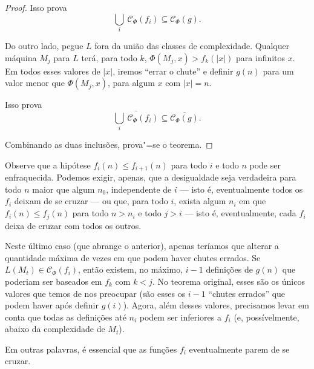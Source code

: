 \begin{proof}
    Isso prova
    \begin{equation*}
        \bigcup_i \ \mathcal C_\Phi(f_i) \subseteq \mathcal C_\Phi(g).
    \end{equation*}

    Do outro lado,
    pegue $L$ fora da união das classes de complexidade.
    Qualquer máquina $M_j$ para $L$
    terá, para todo $k$,
    $\Phi(M_j, x) > f_k(|x|)$ para infinitos $x$.
    Em todos esses valores de $|x|$,
    iremos ``errar o chute''
    e definir $g(n)$
    para um valor menor que $\Phi(M_j, x)$,
    para algum $x$ com $|x| = n$.

    Isso prova
    \begin{equation*}
        \overline{\bigcup_i \ \mathcal C_\Phi(f_i)}
        \subseteq \overline{\mathcal C_\Phi(g)}.
    \end{equation*}

    Combinando as duas inclusões, prova"=se o teorema.
\end{proof}

Observe que a hipótese $f_i(n) \leq f_{i+1}(n)$
para todo $i$ e todo $n$
pode ser enfraquecida.
Podemos exigir, apenas,
que a desigualdade seja verdadeira para todo $n$
maior que algum $n_0$,
independente de $i$
--- isto é, eventualmente todos os $f_i$
deixam de se cruzar
---
ou que, para todo $i$,
exista algum $n_i$ em que
$f_i(n) \leq f_j(n)$ para todo $n > n_i$
e todo $j > i$
--- isto é, eventualmente,
cada $f_i$ deixa de cruzar com todos os outros.

Neste último caso
(que abrange o anterior),
apenas teríamos que alterar a quantidade máxima de vezes
em que podem haver chutes errados.
Se $L(M_t) \in \mathcal C_\Phi(f_i)$,
então existem, no máximo,
$i - 1$ definições de $g(n)$
que poderiam ser baseados em $f_k$
com $k < j$.
No teorema original,
esses são os únicos valores que temos de nos preocupar
(são esses os $i-1$ ``chutes errados'' que podem haver
após definir $g(i)$).
Agora, além desses valores,
precisamos levar em conta que
todas as definições até $n_i$
podem ser inferiores a $f_i$
(e, possívelmente, abaixo da complexidade de $M_t$).

Em outras palavras,
é essencial que as funções $f_i$
eventualmente parem de se cruzar.

